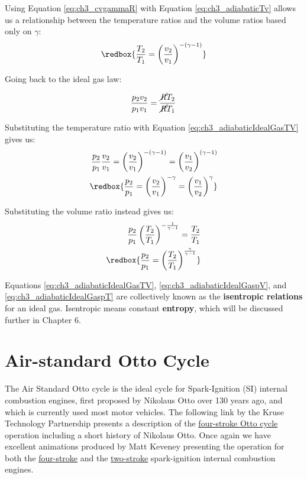 Using Equation \ref{eq:ch3_cvgammaR} with Equation \ref{eq:ch3_adiabaticTv} allows us a relationship between the temperature ratios and the volume ratios based only on $\gamma$:
\begin{align} \label{eq:ch3_adiabaticIdealGasTV}
  \redbox{\frac{T_2}{T_1} = \left(\frac{v_2}{v_1}\right)^{-(\gamma -1)}}
\end{align}

Going back to the ideal gas law:

\begin{equation*}
  \frac{p_2 v_2}{p_1 v_1} = \frac{\cancel{R}T_2}{\cancel{R}T_1}
\end{equation*}

Substituting the temperature ratio with Equation \ref{eq:ch3_adiabaticIdealGasTV} gives us:
\begin{align}
  \nonumber \frac{p_2}{p_1} \frac{v_2}{v_1}= \left(\frac{v_2}{v_1}\right)^{-(\gamma -1)} =  \left(\frac{v_1}{v_2}\right)^{(\gamma -1)}\\
  \label{eq:ch3_adiabaticIdealGaspV} \redbox{\frac{p_2}{p_1} = \left(\frac{v_2}{v_1}\right)^{-\gamma} = \left(\frac{v_1}{v_2}\right)^{\gamma}}
\end{align}

Substituting the volume ratio instead gives us:
\begin{align}
  \nonumber \frac{p_2}{p_1} \left(\frac{T_2}{T_1}\right)^{-\frac{1}{\gamma -1}} = \frac{T_2}{T_1} \\
  \label{eq:ch3_adiabaticIdealGaspT} \redbox{\frac{p_2}{p_1} = \left(\frac{T_2}{T_1}\right)^{\frac{\gamma}{\gamma -1}}}
\end{align}

Equations \ref{eq:ch3_adiabaticIdealGasTV}, \ref {eq:ch3_adiabaticIdealGaspV}, and \ref{eq:ch3_adiabaticIdealGaspT} are collectively known as the {\bf isentropic relations} for an ideal gas.  Isentropic means constant {\bf entropy}, which will be discussed further in Chapter 6.

\newpage
\section{Air-standard Otto Cycle}

The Air Standard Otto cycle is the ideal cycle for Spark-Ignition (SI) internal combustion engines, first proposed by Nikolaus Otto over 130 years ago, and which is currently used most motor vehicles. The following link by the Kruse Technology Partnership presents a description of the \href{http://www.kruse-ltc.com/otto.php}{four-stroke Otto cycle} operation including a short history of Nikolaus Otto. Once again we have excellent animations produced by Matt Keveney presenting the operation for both the \href{http://animatedengines.com/otto.html}{four-stroke} and the \href{http://animatedengines.com/twostroke.html}{two-stroke} spark-ignition internal combustion engines.

